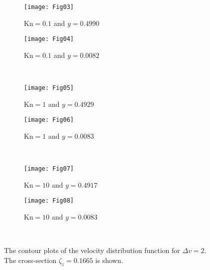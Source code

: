 \documentclass[review]{elsarticle}
\newcommand{\Kn}{\mathrm{Kn}}
\begin{document}
\begin{figure}
    \centering
    \begin{subfigure}[b]{.5\linewidth}
        \texttt{[image: Fig03]}
        \caption{\(\Kn=0.1\) and \(y=0.4990\)}
        \label{fig:distrib-kn0.1:boundary}
    \end{subfigure}%
    \begin{subfigure}[b]{.5\linewidth}
        \texttt{[image: Fig04]}
        \caption{\(\Kn=0.1\) and \(y=0.0082\)}
        \label{fig:distrib-kn0.1:center}
    \end{subfigure}\\
    \begin{subfigure}[b]{.5\linewidth}
        \texttt{[image: Fig05]}
        \caption{\(\Kn=1\) and \(y=0.4929\)}
        \label{fig:distrib-kn1.0:boundary}
    \end{subfigure}%
    \begin{subfigure}[b]{.5\linewidth}
        \texttt{[image: Fig06]}
        \caption{\(\Kn=1\) and \(y=0.0083\)}
        \label{fig:distrib-kn1.0:center}
    \end{subfigure}\\
    \begin{subfigure}[b]{.5\linewidth}
        \texttt{[image: Fig07]}
        \caption{\(\Kn=10\) and \(y=0.4917\)}
        \label{fig:distrib-kn10:boundary}
    \end{subfigure}%
    \begin{subfigure}[b]{.5\linewidth}
        \texttt{[image: Fig08]}
        \caption{\(\Kn=10\) and \(y=0.0083\)}
        \label{fig:distrib-kn10:center}
    \end{subfigure}\\
    \caption{The contour plots of the velocity distribution function for \(\Delta{v}=2\).
        The cross-section \(\zeta_z=0.1665\) is shown.}
    \label{fig:distrib}
\end{figure}
\end{document}

